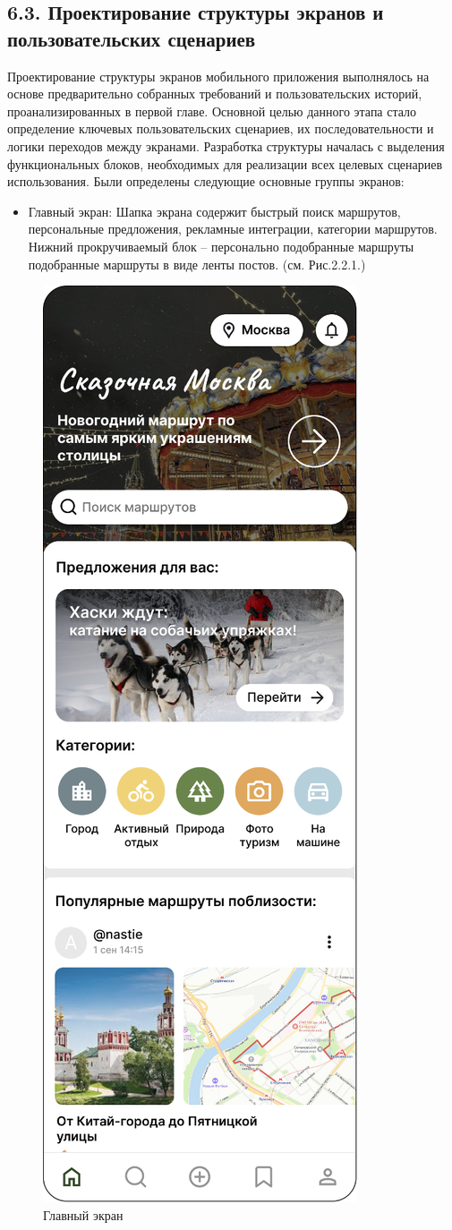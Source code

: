 \subsection*{6.3. Проектирование структуры экранов и пользовательских сценариев} 
Проектирование структуры экранов мобильного приложения выполнялось на основе предварительно собранных требований и пользовательских историй, проанализированных в первой главе. Основной целью данного этапа стало определение ключевых пользовательских сценариев, их последовательности и логики переходов между экранами.
Разработка структуры началась с выделения функциональных блоков, необходимых для реализации всех целевых сценариев использования. Были определены следующие основные группы экранов:
\begin{itemize}
    \item Главный экран: Шапка экрана содержит быстрый поиск маршрутов, персональные предложения, рекламные интеграции, категории маршрутов. Нижний прокручиваемый блок – персонально подобранные маршруты подобранные маршруты в виде ленты постов. (см. Рис.2.2.1.)
\end{itemize}
\begin{figure}[H]
        \centering
        \includegraphics[width=0.4\linewidth]{Images/ui/Picture1.png}
        \caption{Главный экран}
        \label{fig:main_screen_ui_1}
\end{figure}

